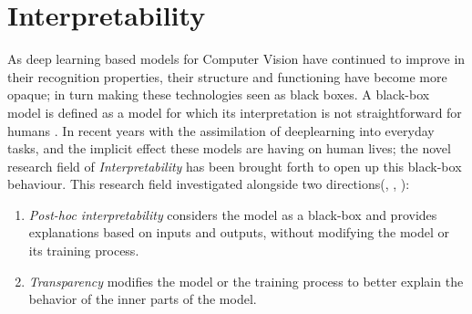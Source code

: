 \section{Interpretability}
\label{rel:sec_int}
As deep learning based models for Computer Vision have continued to improve in their recognition 
properties, their structure and functioning have become more opaque; in turn making these 
technologies seen as black boxes. A black-box model is defined as a model for which its 
interpretation is not straightforward for humans \autocite{petch2022opening}. In recent years 
with the assimilation of deeplearning into everyday tasks, and the implicit effect these models 
are having on human lives; the novel research field of \emph{Interpretability} has been brought 
forth to open up this black-box behaviour. This research field investigated alongside two 
directions(\cite{mythos_interp}, \cite{guidotti2018survey}, \cite{zhang2021survey}):

\begin{enumerate}
	\item \emph{Post-hoc interpretability} considers the model as a black-box and provides 
	explanations based on inputs and outputs, without modifying the model or its training process.
	\item \emph{Transparency} modifies the model or the training process to better explain the 
	behavior of the inner parts of the model.
\end{enumerate}

